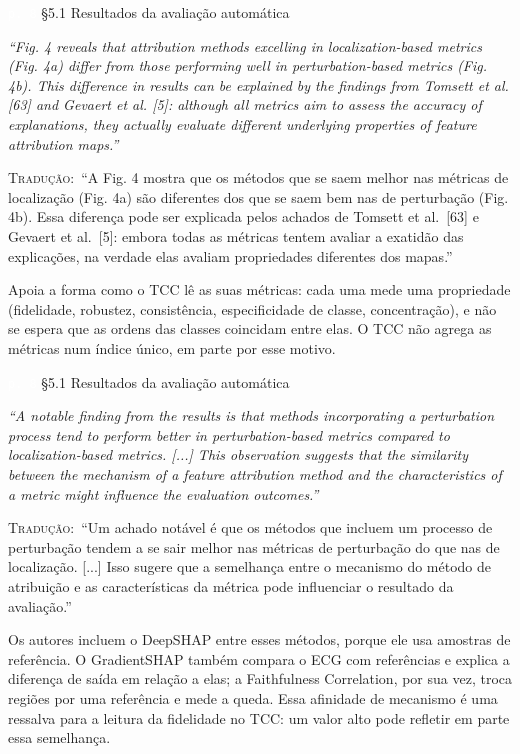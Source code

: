 \documentclass[11pt,a4paper]{article}
\newcommand{\pagechip}[1]{{\setlength{\fboxsep}{1.5pt}\colorbox{cAcc}{\textcolor{white}{\scriptsize\texttt{#1}}}}}
\newenvironment{origquote}{\par\itshape\small}{\par}
\newenvironment{tradquote}{\par\small\textsc{Tradução:}\ }{\par}
\newcommand{\explab}[1]{\par\smallskip{\small\color{cAcc}\textbf{\MakeUppercase{#1}}}\par}
\begin{document}
\begin{citacard}{\pagechip{p. 8} §5.1 Resultados da avaliação automática}
\begin{origquote}“Fig. 4 reveals that attribution methods excelling in localization-based metrics (Fig. 4a) differ from those performing well in perturbation-based metrics (Fig. 4b). This difference in results can be explained by the findings from Tomsett et al. [63] and Gevaert et al. [5]: although all metrics aim to assess the accuracy of explanations, they actually evaluate different underlying properties of feature attribution maps.”\end{origquote}
\begin{tradquote}“A Fig. 4 mostra que os métodos que se saem melhor nas métricas de localização (Fig. 4a) são diferentes dos que se saem bem nas de perturbação (Fig. 4b). Essa diferença pode ser explicada pelos achados de Tomsett et al.\ [63] e Gevaert et al.\ [5]: embora todas as métricas tentem avaliar a exatidão das explicações, na verdade elas avaliam propriedades diferentes dos mapas.”\end{tradquote}
\explab{Explicação}
Apoia a forma como o TCC lê as suas métricas: cada uma mede uma propriedade (fidelidade, robustez, consistência, especificidade de classe, concentração), e não se espera que as ordens das classes coincidam entre elas. O TCC não agrega as métricas num índice único, em parte por esse motivo.
\end{citacard}

\begin{citacard}{\pagechip{p. 8} §5.1 Resultados da avaliação automática}
\begin{origquote}“A notable finding from the results is that methods incorporating a perturbation process tend to perform better in perturbation-based metrics compared to localization-based metrics. [...] This observation suggests that the similarity between the mechanism of a feature attribution method and the characteristics of a metric might influence the evaluation outcomes.”\end{origquote}
\begin{tradquote}“Um achado notável é que os métodos que incluem um processo de perturbação tendem a se sair melhor nas métricas de perturbação do que nas de localização. [...] Isso sugere que a semelhança entre o mecanismo do método de atribuição e as características da métrica pode influenciar o resultado da avaliação.”\end{tradquote}
\explab{Explicação}
Os autores incluem o DeepSHAP entre esses métodos, porque ele usa amostras de referência. O GradientSHAP também compara o ECG com referências e explica a diferença de saída em relação a elas; a Faithfulness Correlation, por sua vez, troca regiões por uma referência e mede a queda. Essa afinidade de mecanismo é uma ressalva para a leitura da fidelidade no TCC: um valor alto pode refletir em parte essa semelhança.
\end{citacard}
\end{document}
